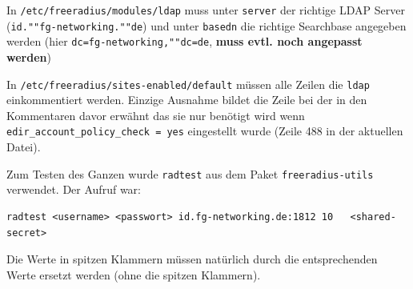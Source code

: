 \documentclass[11pt,a4paper,titlepage=firstiscover,headsepline,bibtotoc]{scrartcl} %
\begin{document}
In \texttt{/etc/freeradius/modules/ldap} muss unter \texttt{server} der richtige LDAP Server (\texttt{id.""fg-networking.""de}) und unter \texttt{basedn} die richtige Searchbase angegeben werden (hier \texttt{dc=fg-networking,""dc=de}, \textbf{muss evtl. noch angepasst werden})

In \texttt{/etc/freeradius/sites-enabled/default} müssen alle Zeilen die \texttt{ldap} einkommentiert werden. Einzige Ausnahme bildet die Zeile bei der in den Kommentaren davor erwähnt das sie nur benötigt wird wenn \texttt{edir\_account\_policy\_check = yes} eingestellt wurde (Zeile 488 in der aktuellen Datei).

Zum Testen des Ganzen wurde \texttt{radtest} aus dem Paket \texttt{freeradius-utils} verwendet. Der Aufruf war:
\begin{lstlisting}
radtest <username> <passwort> id.fg-networking.de:1812 10	<shared-secret>
\end{lstlisting}
Die Werte in spitzen Klammern müssen natürlich durch die entsprechenden Werte ersetzt werden (ohne die spitzen Klammern).


\newpage
\end{document}
